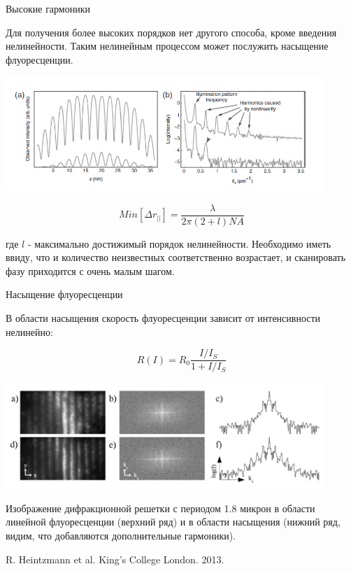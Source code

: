 \documentclass[9pt, compress, xcolor=table]{beamer}
\begin{document}
\begin{frame}{Высокие гармоники}

Для получения более высоких порядков нет другого способа, кроме введения нелинейности. Таким нелинейным процессом может послужить насыщение флуоресценции.
\begin{center}
\includegraphics[width=0.9\textwidth]{ffm18}
\end{center}

\begin{equation*}
\boxed{Min[\Delta r_{||}]=\frac{\lambda}{2\pi (2+l)NA}}
\end{equation*}

где $l$ - максимально достижимый порядок нелинейности. Необходимо иметь ввиду, что и количество неизвестных соответственно возрастает, и сканировать фазу приходится с очень малым шагом.
\end{frame}

\begin{frame}{Насыщение флуоресценции}

В области насыщения скорость флуоресценции зависит от интенсивности нелинейно:

\begin{equation*}
R(I)=R_0\frac{I/I_S}{1+I/I_S}
\end{equation*}

\begin{center}
\includegraphics[width=0.9\textwidth]{nlsim13}
\end{center}

Изображение дифракционной решетки с периодом 1.8 микрон в области линейной флуоресценции (верхний ряд) и в области насыщения (нижний ряд, видим, что добавляются дополнительные гармоники).

R. Heintzmann et al. King's College London. 2013.


\end{frame}
\end{document}
